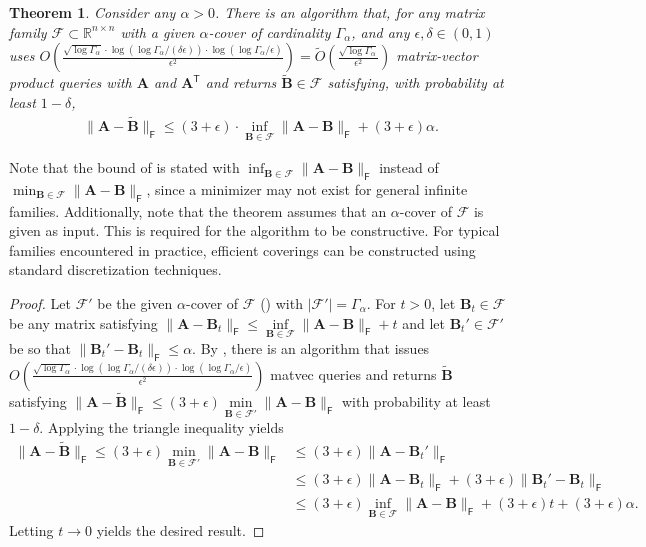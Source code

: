 \documentclass{article}[11pt]
\newtheorem{theorem}{Theorem}
\theoremstyle{definition}
\newcommand{\bv}[1]{\boldsymbol{\mathbf{#1}}}
\newcommand{\T}{\mathsf{T}}
\newcommand{\Fro}{\mathsf{F}}
\newcommand{\F}{\mathcal{F}}
\begin{document}
        \begin{theorem}\label{thm:covering-number-approximation}
            Consider any $\alpha > 0$. There is an algorithm that, for any matrix family $\mathcal{F} \subset \mathbb{R}^{n \times n}$ with a given $\alpha$-cover of cardinality $\Gamma_{\alpha}$, and any $\epsilon,\delta \in (0,1)$ uses  $O\left(\frac{\sqrt{\log\Gamma_\alpha} \cdot \log(\log\Gamma_\alpha/(\delta \epsilon)) \cdot \log(\log \Gamma_\alpha/\epsilon)}{\epsilon^2}\right) = \tilde O\left(\frac{\sqrt{\log \Gamma_{\alpha}}}{\epsilon^2} \right)$ matrix-vector product queries with $\bv A$ and $\bv A^\T$ and returns $\bv{\tilde B} \in \mathcal{F}$ satisfying, with probability at least $1 - \delta$,
            \begin{align*}
                \|\bv{A} - \bv{\tilde B}\|_\Fro \leq (3+\epsilon)\cdot \inf_{\bv{B}\in \mathcal{F}}\|\bv{A} - \bv{B}\|_\Fro + (3 + \epsilon) \alpha.
            \end{align*}
        \end{theorem}
Note that the bound of  is stated with $\inf_{\bv B \in \mathcal{F}} \|\bv A - \bv B\|_\Fro$ instead of $\min_{\bv B \in \mathcal{F}} \|\bv A - \bv B\|_\Fro$, since a minimizer may not exist for general infinite families. Additionally, note that the theorem assumes that an $\alpha$-cover of $\mathcal{F}$ is given as input. This is required for the algorithm to be constructive. For typical families encountered in practice, efficient coverings can be constructed using standard discretization techniques. 
        \begin{proof}
        Let $\mathcal{F}'$ be the given $\alpha$-cover of $\mathcal{F}$ () with $|\mathcal{F}'| = \Gamma_{\alpha}$. 
        For $t > 0$, let $\bv{B}_t \in \mathcal{F}$ be any matrix satisfying $\|\bv{A} - \bv{B}_t\|_\Fro \leq \inf\limits_{\bv{B} \in \mathcal{F}}\|\bv{A} - \bv{B}\|_\Fro + t$ and let $\bv{B}_t' \in \mathcal{F}'$ be so that $\|\bv{B}_t' -\bv{B}_t\|_\Fro \leq \alpha$. 
        By , there is an algorithm that issues $O\left(\frac{\sqrt{\log\Gamma_\alpha} \cdot \log(\log\Gamma_\alpha/(\delta \epsilon)) \cdot \log(\log \Gamma_\alpha/\epsilon)}{\epsilon^2}\right)$ matvec queries and returns $\bv{\tilde B}$ satisfying $\|\bv{A} - \bv{\tilde {B}}\|_\Fro \leq (3+\epsilon)\min\limits_{\bv{B} \in \mathcal{F}'}\|\bv{A} - \bv{B}\|_\Fro$ with probability at least $1-\delta$. Applying the triangle inequality yields
        \begin{align*}
            \|\bv{A} - \bv{\tilde B}\|_\Fro \leq (3+\epsilon)\min\limits_{\bv{B} \in \mathcal{F}'}\|\bv{A} - \bv{B}\|_\Fro &\leq (3+\epsilon)\|\bv{A} - \bv{B}_t'\|_\Fro\\
            & \leq (3+\epsilon)\|\bv{A} - \bv{B}_t\|_\Fro + (3+\epsilon)\|\bv{B}_t' - \bv{B}_t\|_\Fro\\
            & \leq (3+\epsilon)\inf\limits_{\bv{B} \in \F} \|\bv{A} - \bv{B}\|_\Fro + (3+\epsilon)t + (3+\epsilon) \alpha.
        \end{align*}
        Letting $t \to 0$ yields the desired result. 
        \end{proof}
\end{document}
